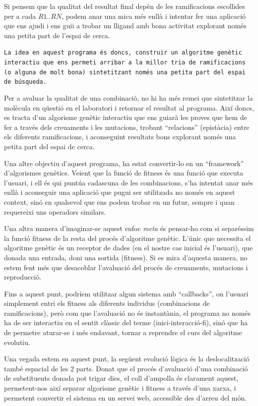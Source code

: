 	Si pensem que la qualitat del resultat final depèn de les
	ramificacions escollides per a cada $R1..RN$, podem anar una mica més enllà i
	intentar fer una aplicació que ens ajudi i ens guii a trobar un lligand amb
	bona activitat explorant només una petita part de l'espai de cerca.
	
	\texttt{La idea en aquest programa és doncs, construir un algoritme genètic
	interactiu que ens permeti arribar a la millor tria de ramificacions (o
	alguna de molt bona) sintetitzant només una petita part del espai de búsqueda.}

	Per a avaluar la qualitat de una combinació, no hi ha més remei que
	sintetitzar la molècula en qüestió en el laboratori i retornar el resultat
	al programa.  Així doncs, es tracta d'un algorisme genètic interactiu que
	ens guiarà les proves que hem de fer a través dels creuaments i les
	mutacions, trobant ``relacions'' (epistàcia) entre els diferents
	ramificacions, i aconseguint resultats bons explorant només una petita part
	del espai de cerca.

	Una altre objectiu d'aquest programa, ha estat convertir-lo en un
	``framework'' d'algorismes genètics.  Veient que la funció de fitness és una
	funció que executa l'usuari, i ell és qui puntúa cadascuna de les
	combinacions, s'ha intentat anar més enllà i aconseguir una aplicació que
	pugui ser utilitzada no només en aquest context, sinó en qualsevol que ens
	podem trobar en un futur, sempre i quan requereixi uns operadors similars.

	Una altra manera d'imaginar-se aquest enfoc \emph{meta} és pensar-ho com si
	separéssim la funció fitness de la resta del procés d'algoritme genètic.
	L'únic que necessita el algoritme genètic és un receptor de dades (en el
	nostre cas inicial és l'usuari), que donada una entrada, doni una
	sortida (fitness).  Si es mira d'aquesta manera, no estem fent més que
	desacoblar l'avaluació del procés de creuaments, mutacions i reproducció.

	Fins a aquest punt, podríem utilitzar algun sistema amb ``callbacks'', on
	l'usuari simplement entri els fitness als diferents individus (combinacions
	de ramificacions), però com que l'avaluació no és instantània, el programa no
	només ha de ser interactiu en el sentit clàssic del terme (inici-interacció-fi),
	sinó que ha de permetre aturar-se i més endavant, tornar a reprendre el curs
	del algoritme evolutiu. 

	Una vegada estem en aquest punt, la següent evolució lògica és la
	deslocalització també espacial de les 2 parts.  Donat que el procés
	d'avaluació d'una combinació de substituents donada pot trigar dies, el coll
	d'ampolla és clarament aquest, permetent-nos així separar algorisme
	genètic i fitness a través d'una xarxa, i permetent convertir el sistema en
	un servei web, accessible des d'arreu del món.

